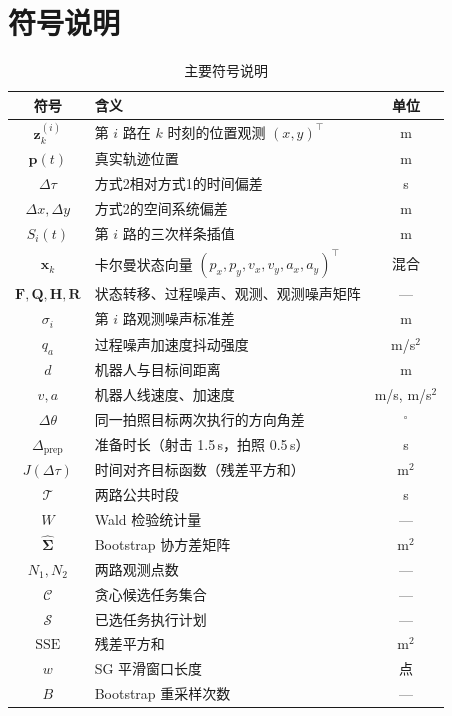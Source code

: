 \section{符号说明}
\vspace{-0.5em}
\begin{table}[H]
    \renewcommand{\arraystretch}{1.3}
    \centering
    \caption{主要符号说明}
    \label{tab:notation}
    \begin{tabular}{@{}clc@{}}
        \toprule
        符号 & 含义 & 单位 \\
        \midrule
        $\boldsymbol{z}_k^{(i)}$ & 第 $i$ 路在 $k$ 时刻的位置观测 $(x,y)^\top$ & m \\
        $\boldsymbol{p}(t)$ & 真实轨迹位置 & m \\
        $\Delta\tau$ & 方式2相对方式1的时间偏差 & s \\
        $\Delta x, \Delta y$ & 方式2的空间系统偏差 & m \\
        $S_i(t)$ & 第 $i$ 路的三次样条插值 & m \\
        $\boldsymbol{x}_k$ & 卡尔曼状态向量 $(p_x, p_y, v_x, v_y, a_x, a_y)^\top$ & 混合 \\
        $\boldsymbol{F}, \boldsymbol{Q}, \boldsymbol{H}, \boldsymbol{R}$ & 状态转移、过程噪声、观测、观测噪声矩阵 & — \\
        $\sigma_i$ & 第 $i$ 路观测噪声标准差 & m \\
        $q_a$ & 过程噪声加速度抖动强度 & m/s$^2$ \\
        $d$ & 机器人与目标间距离 & m \\
        $v, a$ & 机器人线速度、加速度 & m/s, m/s$^2$ \\
        $\Delta\theta$ & 同一拍照目标两次执行的方向角差 & $^\circ$ \\
        $\Delta_{\text{prep}}$ & 准备时长（射击 1.5\,s，拍照 0.5\,s） & s \\
        $J(\Delta\tau)$ & 时间对齐目标函数（残差平方和） & m$^2$ \\
        $\mathcal{T}$ & 两路公共时段 & s \\
        $W$ & Wald 检验统计量 & — \\
        $\hat{\boldsymbol{\Sigma}}$ & Bootstrap 协方差矩阵 & m$^2$ \\
        $N_1, N_2$ & 两路观测点数 & — \\
        $\mathcal{C}$ & 贪心候选任务集合 & — \\
        $\mathcal{S}$ & 已选任务执行计划 & — \\
        $\text{SSE}$ & 残差平方和 & m$^2$ \\
        $w$ & SG 平滑窗口长度 & 点 \\
        $B$ & Bootstrap 重采样次数 & — \\
        \bottomrule
    \end{tabular}
\end{table}
